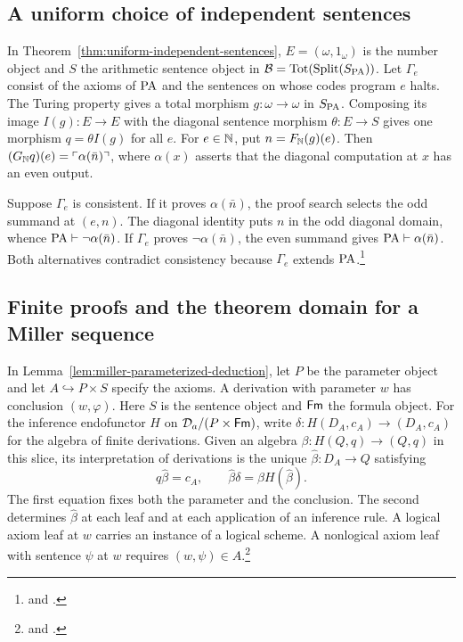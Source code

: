 \subsection{A uniform choice of independent sentences}

In Theorem~\ref{thm:uniform-independent-sentences},
$E=(\omega,1_\omega)$ is the number object and $S$ the arithmetic sentence
object in $\mathcal B=\operatorname{Tot}(\operatorname{Split}(S_{\mathrm{PA}}))$. Let $\Gamma_e$ consist
of the axioms of $\mathrm{PA}$ and the sentences on whose codes program $e$
halts. The Turing property gives a total morphism $g:\omega\to\omega$
in $S_{\mathrm{PA}}$. Composing its image $I(g):E\to E$ with the diagonal
sentence morphism $\theta:E\to S$ gives one morphism
$q=\theta I(g)$ for all $e$. For $e\in\mathbb N$, put $n=F_{\mathbb N}(g)(e)$.
Then $(G_{\mathbb N}q)(e)=\ulcorner\alpha(\bar n)\urcorner$, where
$\alpha(x)$ asserts that the diagonal computation at $x$ has an even output.

Suppose $\Gamma_e$ is consistent. If it proves $\alpha(\bar n)$,
the proof search selects the odd summand at $(e,n)$. The diagonal
identity puts $n$ in the odd diagonal domain, whence
$\mathrm{PA}\vdash\neg\alpha(\bar n)$. If $\Gamma_e$ proves
$\neg\alpha(\bar n)$, the even summand gives
$\mathrm{PA}\vdash\alpha(\bar n)$. Both alternatives contradict consistency
because $\Gamma_e$ extends $\mathrm{PA}$.\footnote{
and .}

\subsection{Finite proofs and the theorem domain for a Miller sequence}

In Lemma~\ref{lem:miller-parameterized-deduction}, let $P$ be the
parameter object and let $A\hookrightarrow P\times S$ specify the
axioms. A derivation with parameter $w$ has conclusion $(w,\varphi)$.
Here $S$ is the sentence object and $\mathsf{Fm}$ the formula object.
For the inference endofunctor $H$ on
$\mathcal D_a/(P\times\mathsf{Fm})$, write $\delta:H(D_A,c_A)\to(D_A,c_A)$
for the algebra of finite derivations. Given an algebra
$\beta:H(Q,q)\to(Q,q)$ in this slice, its interpretation of derivations
is the unique $\widehat\beta:D_A\to Q$ satisfying
\[
     q\widehat\beta=c_A,\qquad \widehat\beta\delta=\beta H(\widehat\beta).
\]
The first equation fixes both the parameter and the conclusion. The
second determines $\widehat\beta$ at each leaf and at each application of an
inference rule. A logical axiom leaf at $w$ carries an instance of a
logical scheme. A nonlogical axiom leaf with sentence $\psi$ at $w$
requires $(w,\psi)\in A$.\footnote{%
and .}

